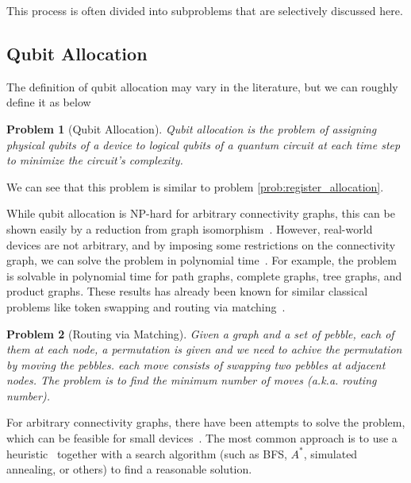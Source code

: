 \documentclass{report}
\newtheorem{problem}{Problem}
\begin{document}
This process is often divided into subproblems that are selectively discussed here.



\subsection{Qubit Allocation}

The definition of qubit allocation may vary in the literature, but we can roughly define it as below

\begin{problem}[Qubit Allocation]
  Qubit allocation is the problem of assigning physical qubits of a device to logical qubits of a quantum circuit at each time step to minimize the circuit's complexity.
\end{problem}

We can see that this problem is similar to problem \ref{prob:register_allocation}.

While qubit allocation is NP-hard for arbitrary connectivity graphs, this can be shown easily by a reduction from graph isomorphism~\cite{siraichi2018}. However, real-world devices are not arbitrary, and by imposing some restrictions on the connectivity graph, we can solve the problem in polynomial time~\cite{childs}. For example, the problem is solvable in polynomial time for path graphs, complete graphs, tree graphs, and product graphs. These results has already been known for similar classical problems like token swapping and routing via matching~\cite{banerjee2017}.

\begin{problem}[Routing via Matching]
  Given a graph and a set of pebble, each of them at each node, a permutation is given and we need to achive the permutation by moving the pebbles. each move consists of swapping two pebbles at adjacent nodes. The problem is to find the minimum number of moves (a.k.a. routing number).
\end{problem}

For arbitrary connectivity graphs, there have been attempts to solve the problem, which can be feasible for small devices~\cite{siraichi2018}. The most common approach is to use a heuristic~\cite{zhang2021, itoko2019, cowtan2019} together with a search algorithm (such as BFS, $A^*$\cite{zulehner2018}, simulated annealing\cite{zhou2020}, or others\cite{li2019}) to find a reasonable solution.
\end{document}
